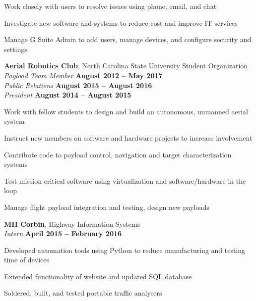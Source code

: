 \documentclass[margin,line]{resume}
\begin{document}
\begin{resume}
\begin{list2}
    \item Work closely with users to resolve issues using phone, email, and chat
    \item Investigate new software and systems to reduce cost and improve IT services
    \item  Manage G Suite Admin to add users, manage devices, and configure security and settings

    \end{list2}
    \vspace{3mm}




    \textbf{Aerial Robotics Club}, North Carolina State University Student Organization\\
    \textsl{Payload Team Member} \hfill \textbf{August 2012 -- May 2017}\\
    \textsl{Public Relations} \hfill \textbf{August 2015 -- August 2016}\\
    \textsl{President} \hfill \textbf{August 2014 -- August 2015}\\
    \vspace{-3mm}
    \begin{list2}
    \item Work with fellow students to design and build an autonomous, unmanned aerial system
    \item Instruct new members on software and hardware projects to increase involvement
    \item Contribute code to payload control, navigation and target characterization systems
    \item Test mission critical software using virtualization and software/hardware in the loop
	\item Manage flight payload integration and testing, design new payloads
    \end{list2}
    \vspace{3mm}




    \textbf{MH Corbin}, Highway Information Systems\\
    \textsl{Intern}  \hfill \textbf{April 2015 -- February 2016} \\
    \vspace{-4mm}
    \begin{list2}
    \item Developed automation tools using Python to reduce manufacturing and testing time of devices
    \item Extended functionality of website and updated SQL database
    \item Soldered, built, and tested portable traffic analysers
    \end{list2}
    \vspace{3mm}




\end{resume}
\end{document}
